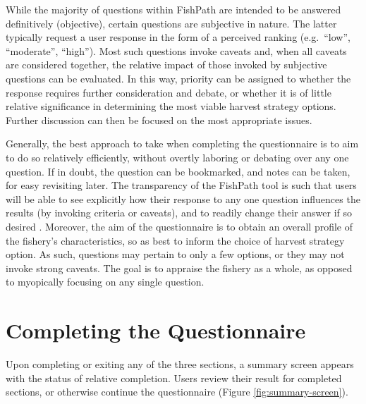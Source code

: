 \documentclass[11pt,]{book}
\begin{document}
While the majority of questions within FishPath are intended to be answered definitively (objective), certain questions are subjective in nature. The latter typically request a user response in the form of a perceived ranking (e.g.~``low'', ``moderate'', ``high''). Most such questions invoke caveats and, when all caveats are considered together, the relative impact of those invoked by subjective questions can be evaluated. In this way, priority can be assigned to whether the response requires further consideration and debate, or whether it is of little relative significance in determining the most viable harvest strategy options. Further discussion can then be focused on the most appropriate issues.

Generally, the best approach to take when completing the questionnaire is to aim to do so relatively efficiently, without overtly laboring or debating over any one question. If in doubt, the question can be bookmarked, and notes can be taken, for easy revisiting later. The transparency of the FishPath tool is such that users will be able to see explicitly how their response to any one question influences the results (by invoking criteria or caveats), and to readily change their answer if so desired . Moreover, the aim of the questionnaire is to obtain an overall profile of the fishery's characteristics, so as best to inform the choice of harvest strategy option. As such, questions may pertain to only a few options, or they may not invoke strong caveats. The goal is to appraise the fishery as a whole, as opposed to myopically focusing on any single question.

\hypertarget{completing-the-questionnaire}{%
\section{Completing the Questionnaire}\label{completing-the-questionnaire}}

Upon completing or exiting any of the three sections, a summary screen appears with the status of relative completion. Users review their result for completed sections, or otherwise continue the questionnaire (Figure \ref{fig:summary-screen}).
\end{document}
